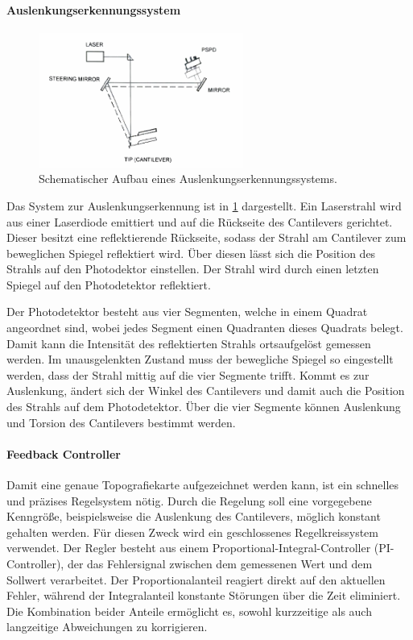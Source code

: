 \paragraph{Auslenkungserkennungssystem}
\begin{figure}
    \centering
    \includegraphics[width=0.6\textwidth]{../assets/messmethoden/afm/02_beam}
    \caption{Schematischer Aufbau eines Auslenkungserkennungssystems. }
    \label{fig:afm-beam}
\end{figure}
Das System zur Auslenkungserkennung ist in \cref{fig:afm-beam} dargestellt.
Ein Laserstrahl wird aus einer Laserdiode emittiert und auf die Rückseite des Cantilevers gerichtet.
Dieser besitzt eine reflektierende Rückseite, sodass der Strahl am Cantilever zum beweglichen Spiegel reflektiert wird.
Über diesen lässt sich die Position des Strahls auf den Photodektor einstellen.
Der Strahl wird durch einen letzten Spiegel auf den Photodetektor reflektiert.


Der Photodetektor besteht aus vier Segmenten, welche in einem Quadrat angeordnet sind, wobei jedes Segment einen
Quadranten dieses Quadrats belegt.
Damit kann die Intensität des reflektierten Strahls ortsaufgelöst gemessen werden.
Im unausgelenkten Zustand muss der bewegliche Spiegel so eingestellt werden, dass der Strahl mittig auf die vier
Segmente trifft.
Kommt es zur Auslenkung, ändert sich der Winkel des Cantilevers und damit auch die Position des Strahls auf dem
Photodetektor.
Über die vier Segmente können Auslenkung und Torsion des Cantilevers bestimmt werden.

\paragraph{Feedback Controller}
Damit eine genaue Topografiekarte aufgezeichnet werden kann, ist ein schnelles und präzises Regelsystem nötig.
Durch die Regelung soll eine vorgegebene Kenngröße, beispielsweise die Auslenkung des Cantilevers, möglich konstant
gehalten werden.
Für diesen Zweck wird ein geschlossenes Regelkreissystem verwendet.
Der Regler besteht aus einem Proportional-Integral-Controller (PI-Controller), der das Fehlersignal zwischen dem
gemessenen Wert und dem Sollwert verarbeitet.
Der Proportionalanteil reagiert direkt auf den aktuellen Fehler, während der Integralanteil konstante Störungen über
die Zeit eliminiert.
Die Kombination beider Anteile ermöglicht es, sowohl kurzzeitige als auch langzeitige Abweichungen zu
korrigieren.

